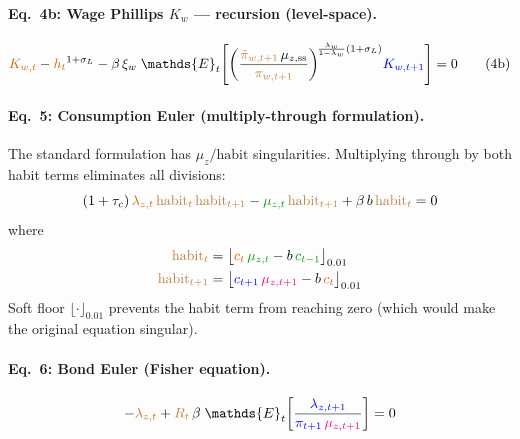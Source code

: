 \documentclass[11pt]{article}
\begin{document}
\paragraph{Eq.~4b: Wage Phillips $K_w$ --- recursion (level-space).}
\begin{equation}
  \textcolor{orange!80!black}{K_{w,t}}
  - \textcolor{orange!80!black}{h_t}^{1+\sigma_L}
  - \beta\,\xi_w\;\mathds{E}_t\!\left[
    \left(\frac{\textcolor{brown}{\tilde\pi_{w,t+1}}\,\mu_{z,\text{ss}}}
         {\textcolor{brown}{\pi_{w,t+1}}}\right)^{\!\frac{\lambda_w}{1-\lambda_w}(1+\sigma_L)}
    \!\textcolor{blue}{K_{w,t+1}}
  \right] = 0
  \tag{4b}
\end{equation}

\paragraph{Eq.~5: Consumption Euler (multiply-through formulation).}
The standard formulation has $\mu_z / \text{habit}$ singularities.
Multiplying through by both habit terms eliminates all divisions:
\begin{equation}
  (1+\tau_c)\,\textcolor{orange!80!black}{\lambda_{z,t}}\,
  \textcolor{brown}{\text{habit}_{t}}\,\textcolor{brown}{\text{habit}_{t+1}}
  - \textcolor{green!60!black}{\mu_{z,t}}\,\textcolor{brown}{\text{habit}_{t+1}}
  + \beta\,b\,\textcolor{brown}{\text{habit}_{t}} = 0
\end{equation}
where
\begin{align*}
  \textcolor{brown}{\text{habit}_t}
    &= \bigl\lfloor \textcolor{orange!80!black}{c_t}\,\textcolor{green!60!black}{\mu_{z,t}}
       - b\,\textcolor{green!60!black}{c_{t-1}} \bigr\rfloor_{0.01}
  \\
  \textcolor{brown}{\text{habit}_{t+1}}
    &= \bigl\lfloor \textcolor{blue}{c_{t+1}}\,\textcolor{magenta}{\mu_{z,t+1}}
       - b\,\textcolor{orange!80!black}{c_t} \bigr\rfloor_{0.01}
\end{align*}
Soft floor $\lfloor \cdot \rfloor_{0.01}$ prevents the habit term from
reaching zero (which would make the original equation singular).

\paragraph{Eq.~6: Bond Euler (Fisher equation).}
\begin{equation}
  -\textcolor{orange!80!black}{\lambda_{z,t}}
  + \textcolor{brown}{R_t}\,\beta\;\mathds{E}_t\!\left[
    \frac{\textcolor{blue}{\lambda_{z,t+1}}}
      {\textcolor{blue}{\pi_{t+1}}\,\textcolor{magenta}{\mu_{z,t+1}}}
  \right] = 0
\end{equation}
\end{document}
